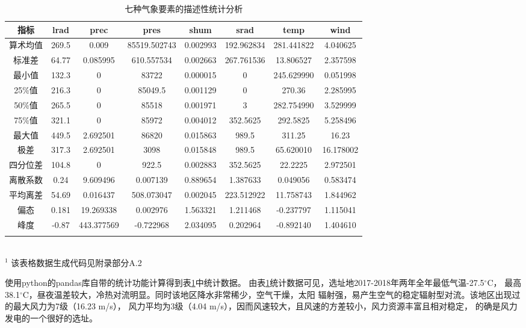 \documentclass[AutoFakeBold]{LZUThesis}
\begin{document}
\begin{table}[H]
    \centering
    \caption{七种气象要素的描述性统计分析}
    \begin{tabular}{cccccccc}
    \toprule
    指标 & lrad & prec & pres & shum & srad & temp & wind \\
    \midrule
    算术均值 & 269.5 & 0.009 & 85519.502743 & 0.002993 & 192.962834 & 281.441822 & 4.040625 \\
    标准差 & 64.77 & 0.085995 & 610.557534 & 0.002663 & 267.761536 & 13.806527 & 2.357598 \\
    最小值 & 132.3 & 0 & 83722 & 0.000015 & 0 & 245.629990 & 0.051998 \\
    25\%值 & 216.3 & 0 & 85049.5 & 0.001129 & 0 & 270.36 & 2.285995 \\
    50\%值 & 265.5 & 0 & 85518 & 0.001971 & 3 & 282.754990 & 3.529999 \\
    75\%值 & 321.1 & 0 & 85972 & 0.004012 & 352.5625 & 292.5825 & 5.258496 \\
    最大值 & 449.5 & 2.692501 & 86820 & 0.015863 & 989.5 & 311.25 & 16.23 \\
    极差 & 317.3 & 2.692501 & 3098 & 0.015848 & 989.5 & 65.620010 & 16.178002 \\
    四分位差 & 104.8 & 0 & 922.5 & 0.002883 & 352.5625 & 22.2225 & 2.972501 \\
    离散系数 & 0.24 & 9.609496 & 0.007139 & 0.889654 & 1.387633 & 0.049056 & 0.583474 \\
    平均离差 & 54.69 & 0.016437 & 508.073047 & 0.002045 & 223.512922 & 11.758743 & 1.844962 \\
    偏态 & 0.181 & 19.269338 & 0.002976 & 1.563321 & 1.211468 & -0.237797 & 1.115041 \\
    峰度 & -0.87 & 443.377569 & -0.722968 & 2.034095 & 0.202964 & -0.892140 & 1.404610 \\
    \bottomrule \\
    \end{tabular} \\
    \footnotesize{$^1$ 该表格数据生成代码见附录部分A.2} \\
    \label{analysis}
\end{table}

使用python的pandas库自带的统计功能计算得到表\ref{analysis}中统计数据。
由表\ref{analysis}统计数据可见，选址地2017-2018年两年全年最低气温-27.5$^{\circ}$C，
最高38.1$^{\circ}$C，昼夜温差较大，冷热对流明显。同时该地区降水非常稀少，空气干燥，太阳
辐射强，易产生空气的稳定辐射型对流。该地区出现过的最大风力为7级（16.23 m/s），
风力平均为3级（4.04 m/s），因而风速较大，且风速的方差较小，风力资源丰富且相对稳定，
的确是风力发电的一个很好的选址。
\end{document}
